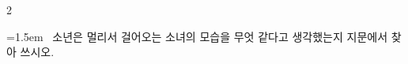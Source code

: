 \documentclass[11pt, a4paper]{article}
\begin{document}
\begin{multicols}{2}
\begin{minipage}{\columnwidth}
\vspace{3mm}
\noindent\hrulefill
\vspace{2.5mm}
\noindent\hrulefill
\vspace{2.5mm}
\noindent\hrulefill
\vspace{2.5mm}
\noindent\hrulefill
\vspace{2.5mm}
\noindent\hrulefill
\vspace{2.5mm}
\vspace{1mm}
\vspace{4mm}
\end{minipage}
\par

\noindent\begin{minipage}{\columnwidth}
\vspace{2mm}
{\hangindent=1.5em  ~소년은 멀리서 걸어오는 소녀의 모습을 무엇 같다고 생각했는지 지문에서 찾아 쓰시오.\par}

\vspace{3mm}
\noindent\hrulefill
\vspace{2.5mm}
\noindent\hrulefill
\vspace{2.5mm}
\noindent\hrulefill
\vspace{2.5mm}
\noindent\hrulefill
\vspace{2.5mm}
\noindent\hrulefill
\vspace{2.5mm}
\vspace{1mm}
\vspace{4mm}
\end{minipage}
\par


\vspace{1mm}
\vspace{0.5mm}


\end{multicols}
\end{document}
